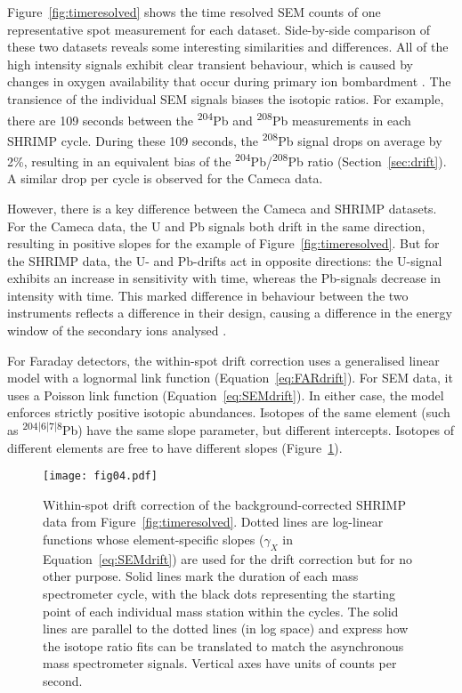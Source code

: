 \documentclass{article}
\begin{document}
Figure~\ref{fig:timeresolved} shows the time resolved SEM counts of
one representative spot measurement for each dataset. Side-by-side
comparison of these two datasets reveals some interesting similarities
and differences. All of the high intensity signals exhibit clear
transient behaviour, which is caused by changes in oxygen availability
that occur during primary ion bombardment \citep{magee2017}. The
transience of the individual SEM signals biases the isotopic
ratios. For example, there are 109 seconds between the
\textsuperscript{204}Pb and \textsuperscript{208}Pb measurements in
each SHRIMP cycle. During these 109 seconds, the
\textsuperscript{208}Pb signal drops on average by 2\%, resulting in
an equivalent bias of the
\textsuperscript{204}Pb/\textsuperscript{208}Pb ratio
(Section~\ref{sec:drift}). A similar drop per cycle is observed for
the Cameca data.\medskip

However, there is a key difference between the Cameca and SHRIMP
datasets. For the Cameca data, the U and Pb signals both drift in the
same direction, resulting in positive slopes for the example of
Figure~\ref{fig:timeresolved}. But for the SHRIMP data, the U- and
Pb-drifts act in opposite directions: the U-signal exhibits an
increase in sensitivity with time, whereas the Pb-signals decrease in
intensity with time.  This marked difference in behaviour between the
two instruments reflects a difference in their design, causing a
difference in the energy window of the secondary ions analysed
\citep{ireland2003}.\medskip

For Faraday detectors, the within-spot drift correction uses a
generalised linear model with a lognormal link function
(Equation~\ref{eq:FARdrift}).  For SEM data, it uses a Poisson link
function (Equation~\ref{eq:SEMdrift}).  In either case, the model
enforces strictly positive isotopic abundances. Isotopes of the same
element (such as \textsuperscript{$204|6|7|8$}Pb) have the same slope
parameter, but different intercepts. Isotopes of different elements
are free to have different slopes (Figure~\ref{fig:drift}).\medskip

\begin{figure}[!htbp]
  \centering
  \texttt{[image: fig04.pdf]}
  \parbox{.7\textwidth}{
  \caption{Within-spot drift correction of the background-corrected
    SHRIMP data from Figure~\ref{fig:timeresolved}. Dotted lines are
    log-linear functions whose element-specific slopes ($\gamma_X$ in
    Equation~\ref{eq:SEMdrift}) are used for the drift correction but
    for no other purpose.  Solid lines mark the duration of each mass
    spectrometer cycle, with the black dots representing the starting
    point of each individual mass station within the cycles.  The
    solid lines are parallel to the dotted lines (in log space) and
    express how the isotope ratio fits can be translated to match the
    asynchronous mass spectrometer signals.  Vertical axes have units
    of counts per second.}
  \label{fig:drift}
  }
\end{figure}
\end{document}
